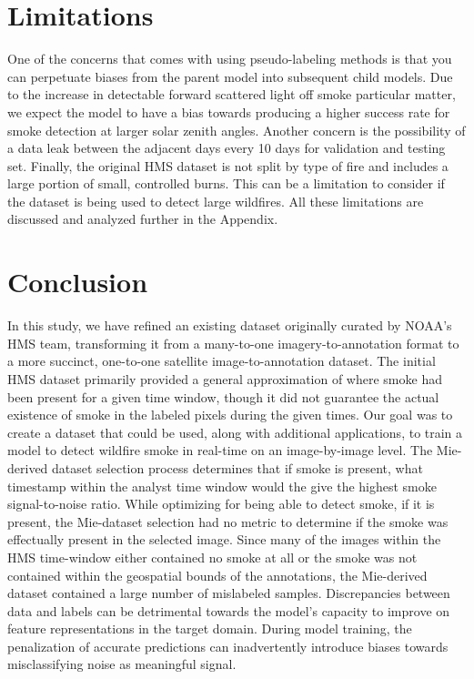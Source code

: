 \documentclass{article}
\begin{document}
\section{Limitations}

One of the concerns that comes with using pseudo-labeling methods is that you can perpetuate biases from the parent model into subsequent child models. Due to the increase in detectable forward scattered light off smoke particular matter, we expect the model to have a bias towards producing a higher success rate for smoke detection at larger solar zenith angles. Another concern is the possibility of a data leak between the adjacent days every 10 days for validation and testing set. Finally, the original HMS dataset is not split by type of fire and includes a large portion of small, controlled burns. This can be a limitation to consider if the dataset is being used to detect large wildfires. All these limitations are discussed and analyzed further in the Appendix. 

\section{Conclusion}

In this study, we have refined an existing dataset originally curated by NOAA's HMS team, transforming it from a many-to-one imagery-to-annotation format to a more succinct, one-to-one satellite image-to-annotation dataset. The initial HMS dataset primarily provided a general approximation of where smoke had been present for a given time window, though it did not guarantee the actual existence of smoke in the labeled pixels during the given times. Our goal was to create a dataset that could be used, along with additional applications, to train a model to detect wildfire smoke in real-time on an image-by-image level. The Mie-derived dataset selection process determines that if smoke is present, what timestamp within the analyst time window would the give the highest smoke signal-to-noise ratio. While optimizing for being able to detect smoke, if it is present, the Mie-dataset selection had no metric to determine if the smoke was effectually present in the selected image. Since many of the images within the HMS time-window either contained no smoke at all or the smoke was not contained within the geospatial bounds of the annotations, the Mie-derived dataset contained a large number of mislabeled samples. Discrepancies between data and labels can be detrimental towards the model's capacity to improve on feature representations in the target domain. During model training, the penalization of accurate predictions can inadvertently introduce biases towards misclassifying noise as meaningful signal. 
\end{document}
